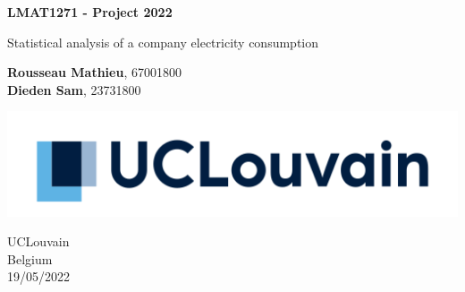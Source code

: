 \begin{titlepage}
  \begin{center}
    \vspace*{1cm}
        
    \Huge
    \textbf{LMAT1271 - Project 2022}
        
    \vspace{0.5cm}
    \LARGE
    Statistical analysis of a company electricity consumption
        
    \vspace{2.5cm}
    
    \Large
    \textbf{Rousseau Mathieu}, 67001800 \\
    \textbf{Dieden Sam}, 23731800
        
    \vfill
        
        
    \vspace{0.8cm}
        
    \includegraphics[width=\textwidth]{figures/logo_ucl.png}

    \vspace{0.8cm}
        
    \Large
    UCLouvain \\
    Belgium \\
    19/05/2022
  \end{center}
\end{titlepage}